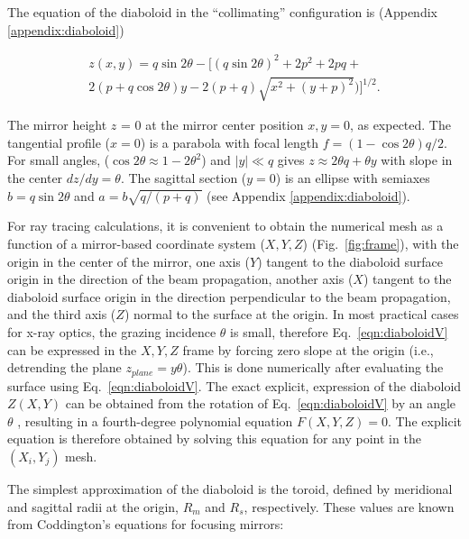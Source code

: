 \documentclass{iucr}       %
\begin{document}
The equation of the diaboloid in the ``collimating'' configuration is (Appendix \ref{appendix:diaboloid})

\begin{multline}
\label{eqn:diaboloidV}
z(x,y) = q \sin2\theta - 
[ (q \sin{2\theta})^2 + 2p^2 + 2 p q + \\
2 (p + q \cos{2\theta}) y - 2 (p+q) \sqrt{x^2 + (y + p)^2}) ]^{1/2}.
\end{multline}

The mirror height $z$ = 0 at the mirror center position $x, y = 0$, as expected. The tangential profile ($x=0$) is a parabola with focal length $ f = (1-\cos2\theta) q/2$. For small angles, ($\cos2\theta\approx 1 - 2\theta^2$) and $|y|\ll q$ gives $z\approx 2 \theta q + \theta y$ with slope in the center $dz/dy=\theta$. The sagittal section ($y=0$) is an ellipse with semiaxes $b=q \sin2\theta$ and $a=b \sqrt{q /(p+q)}$ (see Appendix \ref{appendix:diaboloid}). 

For ray tracing calculations, it is convenient to obtain the numerical mesh as a function of a mirror-based coordinate system ($X,Y,Z$) (Fig.~\ref{fig:frame}), with the origin in the center of the mirror, one axis ($Y$) tangent to the diaboloid surface origin in the direction of the beam propagation, another axis ($X$) tangent to the diaboloid surface origin in the direction perpendicular to the beam propagation, and the third axis ($Z$) normal to the surface at the origin. In most practical cases for x-ray optics, the grazing incidence $\theta$ is small, therefore Eq.~\ref{eqn:diaboloidV} can be expressed in the $X,Y,Z$ frame by forcing zero slope at the origin (i.e., detrending the plane $z_{plane}=y \theta$). This is done numerically after evaluating the surface using Eq.~\ref{eqn:diaboloidV}. The exact explicit, expression of the diaboloid $Z(X,Y)$ can be obtained from the rotation of Eq.~\ref{eqn:diaboloidV} by an angle $\theta$ \cite{part2}, resulting in a fourth-degree polynomial equation $F(X,Y,Z)=0$. The explicit equation is therefore obtained by solving this equation for any point in the $(X_i,Y_j)$ mesh.

The simplest approximation of the diaboloid is the toroid, defined by meridional and sagittal radii at the origin, $R_m$ and $R_s$, respectively. These values are known from Coddington's equations for focusing mirrors:

\end{document}
